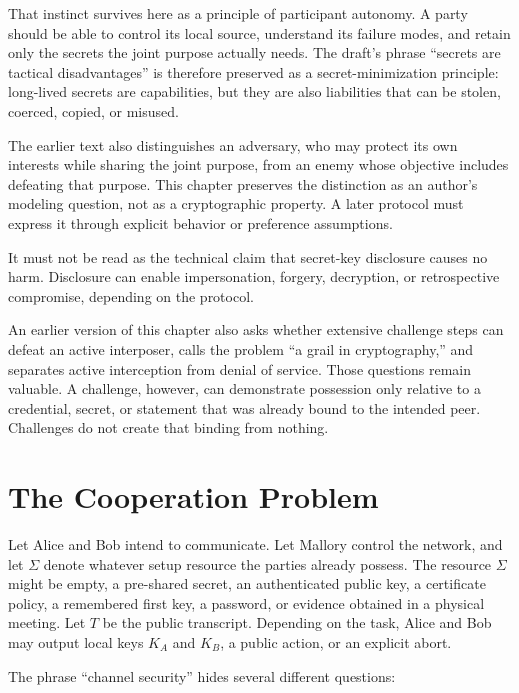 That instinct survives here as a principle of participant autonomy.  A party
should be able to control its local source, understand its failure modes, and
retain only the secrets the joint purpose actually needs.  The draft's phrase
``secrets are tactical disadvantages'' is therefore preserved as a
secret-minimization principle: long-lived secrets are capabilities, but they
are also liabilities that can be stolen, coerced, copied, or misused.

The earlier text also distinguishes an adversary, who may protect its own
interests while sharing the joint purpose, from an enemy whose objective
includes defeating that purpose.  This chapter preserves the distinction as an
author's modeling question, not as a cryptographic property.  A later protocol
must express it through explicit behavior or preference assumptions.

It must not be read as the technical claim that secret-key disclosure causes
no harm.  Disclosure can enable impersonation, forgery, decryption, or
retrospective compromise, depending on the protocol.

An earlier version of this chapter also asks whether extensive challenge steps
can defeat an active interposer, calls the problem ``a grail in cryptography,''
and separates active interception from denial of service.  Those questions
remain valuable.  A challenge, however, can demonstrate possession only
relative to a credential, secret, or statement that was already bound to the
intended peer.  Challenges do not create that binding from nothing.

\section{The Cooperation Problem}

Let Alice and Bob intend to communicate.  Let Mallory control the network, and
let $\Sigma$ denote whatever setup resource the parties already possess.  The
resource $\Sigma$ might be empty, a pre-shared secret, an authenticated public
key, a certificate policy, a remembered first key, a password, or evidence
obtained in a physical meeting.  Let $T$ be the public transcript.  Depending
on the task, Alice and Bob may output local keys $K_A$ and $K_B$, a public
action, or an explicit abort.

The phrase ``channel security'' hides several different questions:

